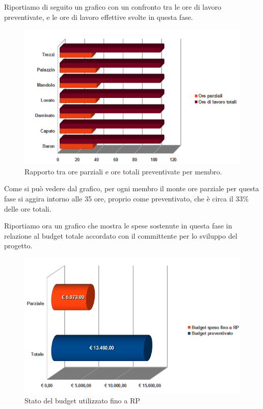 \newpage
Riportiamo di seguito un grafico con un confronto tra le ore di lavoro
preventivate, e le ore di lavoro effettive svolte in questa fase.

\vspace{0cm}
\begin{figure}[htbp!]
  \centering
  \includegraphics[width=17.2cm, angle=0]{img/PP/ORE-RP.png}
\caption{Rapporto tra ore parziali e ore totali preventivate per membro.}
\end{figure}
\vspace{0.5cm}

Come si pu\`o vedere dal grafico, per ogni membro il monte ore parziale per
questa fase si aggira intorno alle 35 ore, proprio come preventivato, che \`e
circa il 33\% delle ore totali.

\newpage
Riportiamo ora un grafico che mostra le spese sostenute in questa
fase in relazione al budget totale accordato con il committente per lo sviluppo del progetto.

\vspace{0cm}
\begin{figure}[htbp!]
  \centering
  \includegraphics[width=15cm, angle=0]{img/PP/BUDGET-RP.png}
\caption{Stato del budget utilizzato fino a RP}
\end{figure}
\vspace{0.5cm}


